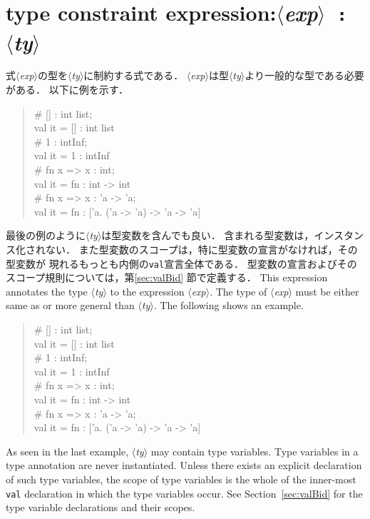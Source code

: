 \documentclass{jbook}
\newcommand{\txt}[2]{#2}
\newcommand{\code}[1]{\mbox{\large\tt #1}}
\newcommand{\nonterm}[1]{\mbox{$\langle$}{\it #1}\mbox{$\rangle$}}
\newcommand{\term}[1]{\mbox{{\tt #1}}}
\newenvironment{program}{\begin{quote}\begin{tt}}%
                        {\end{tt}\end{quote}}
\begin{document}
\section{\txt{型制約式}{type constraint expression}:\nonterm{exp}\ \term{:}\ \nonterm{ty}}

\ifjp%
	式\nonterm{exp}の型を\nonterm{ty}に制約する式である．
	\nonterm{exp}は型\nonterm{ty}より一般的な型である必要がある．
	以下に例を示す．
\begin{program}
\# [] : int list;
\\
val it = [] : int list
\\
\# 1 : intInf;
\\
val it = 1 : intInf
\\
\# fn x => x : int;
\\
val it = fn : int -> int
\\
\# fn x => x : 'a -> 'a;
\\
val it = fn : ['a. ('a -> 'a) -> 'a -> 'a]
\end{program}
	最後の例のように\nonterm{ty}は型変数を含んでも良い．
	含まれる型変数は，インスタンス化されない．
	また型変数のスコープは，特に型変数の宣言がなければ，その型変数が
現れるもっとも内側の\code{val}宣言全体である．
	型変数の宣言およびそのスコープ規則については，第\ref{sec:valBid}
節で定義する．
\else%
	This expression annotates the type \nonterm{ty} to
the expression \nonterm{exp}.
	The type of \nonterm{exp} must be either same as or more
general than \nonterm{ty}.
	The following shows an example.
\begin{program}
\# [] : int list;
\\
val it = [] : int list
\\
\# 1 : intInf;
\\
val it = 1 : intInf
\\
\# fn x => x : int;
\\
val it = fn : int -> int
\\
\# fn x => x : 'a -> 'a;
\\
val it = fn : ['a. ('a -> 'a) -> 'a -> 'a]
\end{program}
	As seen in the last example,
\nonterm{ty} may contain type variables.
	Type variables in a type annotation are never instantiated.
	Unless there exists an explicit declaration of such type variables,
the scope of type variables is the whole of the inner-most \code{val}
declaration in which the type variables occur.
	See Section~\ref{sec:valBid} for the type variable
declarations and their scopes.
\fi%
\end{document}
